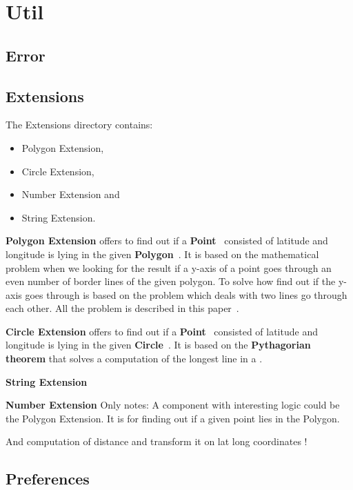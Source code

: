 \section{Util}\label{sec:util}

\subsection{Error}\label{subsec:error}

\subsection{Extensions}\label{subsec:extensions}
The Extensions directory contains:
\begin{itemize}
    \item Polygon Extension,
    \item Circle Extension,
    \item Number Extension and
    \item String Extension.
\end{itemize}
\textbf{Polygon Extension} offers to find out if a \textbf{Point}~\cite{} consisted of latitude and longitude is lying in the given \textbf{Polygon}~\cite{}.
It is based on the mathematical problem when we looking for the result if a y-axis of a point goes through an even number of border lines of the given polygon.
To solve how find out if the y-axis goes through is based on the problem which deals with two lines go through each other.
All the problem is described in this paper~\cite{}.

\textbf{Circle Extension} offers to find out if a \textbf{Point}~\cite{} consisted of latitude and longitude is lying in the given \textbf{Circle}~\cite{}.
It is based on the \textbf{Pythagorian theorem} that solves a computation of the longest line in a .

\textbf{String Extension}

\textbf{Number Extension}
Only notes:
A component with interesting logic could be the Polygon Extension.
It is for finding out if a given point lies in the Polygon.

And computation of distance and transform it on lat long coordinates !

\subsection{Preferences}\label{subsec:preferences}
